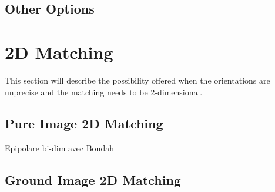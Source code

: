 \subsection{Other Options}

\section{2D Matching}

This section will describe the possibility offered when the orientations
are unprecise and the matching needs to be 2-dimensional.

\subsection{Pure Image 2D Matching}
Epipolare bi-dim avec Boudah

\subsection{Ground Image 2D Matching}

 




